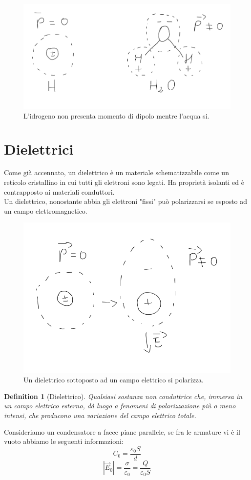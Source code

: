\documentclass[10pt,a4paper]{article}
\newtheorem{definition}{Definition}
\begin{document}
\begin{figure}[h!]
	\centering
	\includegraphics[width=0.5\linewidth]{images/dipolo_H_H2O}
	\caption{L'idrogeno non presenta momento di dipolo mentre l'acqua si.}
	\label{fig:dipolohh2o}
\end{figure}
\FloatBarrier
\section{Dielettrici}
Come già accennato, un dielettrico è un materiale schematizzabile come un reticolo cristallino in cui tutti gli elettroni sono legati. Ha proprietà isolanti ed è contrapposto ai materiali conduttori.\\
Un dielettrico, nonostante abbia gli elettroni "fissi" può polarizzarsi se esposto ad un campo elettromagnetico.
\begin{figure}[h!]
	\centering
	\includegraphics[width=0.6\linewidth]{images/dielettrico_idrogeno}
	\caption{Un dielettrico sottoposto ad un campo elettrico si polarizza.}
	\label{fig:dielettricoidrogeno}
\end{figure}
\FloatBarrier
\begin{definition}[Dielettrico]
	Qualsiasi sostanza non conduttrice che, immersa in un campo elettrico esterno, dà luogo a fenomeni di polarizzazione più o meno intensi, che producono una variazione del campo elettrico totale.
\end{definition}
Consideriamo un condensatore a facce piane parallele, se fra le armature vi è il vuoto abbiamo le seguenti informazioni:
\[C_0 = \frac{\varepsilon_0S}{d}\]
\[|\vec{E}_0| = \frac{\sigma}{\varepsilon_0} = \frac{Q}{\varepsilon_0 S}\]
\end{document}
